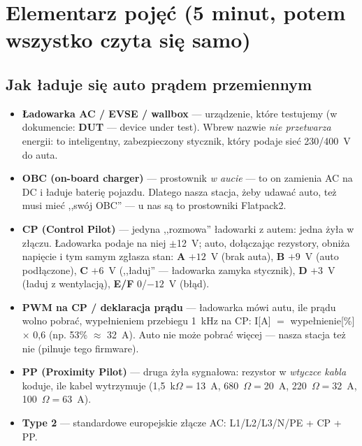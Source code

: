 \documentclass[11pt,a4paper]{article}
\newcommand{\ohm}{$\Omega$}
\newcommand{\poj}[2]{\item \textbf{#1} --- #2}
\begin{document}
\section{Elementarz pojęć (5 minut, potem wszystko czyta się samo)}
\label{sec:elementarz}

\subsection{Jak ładuje się auto prądem przemiennym}
\begin{itemize}
\poj{Ładowarka AC / EVSE / wallbox}{urządzenie, które testujemy (w dokumencie: \textbf{DUT} ---
device under test). Wbrew nazwie \emph{nie przetwarza} energii: to inteligentny, zabezpieczony
stycznik, który podaje sieć 230/400~V do auta.}
\poj{OBC (on-board charger)}{prostownik \emph{w aucie} --- to on zamienia AC na DC i ładuje baterię
pojazdu. Dlatego nasza stacja, żeby udawać auto, też musi mieć ,,swój OBC'' --- u nas są to
prostowniki Flatpack2.}
\poj{CP (Control Pilot)}{jedyna ,,rozmowa'' ładowarki z autem: jedna żyła w złączu. Ładowarka podaje
na niej $\pm$12~V; auto, dołączając rezystory, obniża napięcie i tym samym zgłasza stan:
\textbf{A} $+12$~V (brak auta), \textbf{B} $+9$~V (auto podłączone), \textbf{C} $+6$~V (,,ładuj'' ---
ładowarka zamyka stycznik), \textbf{D} $+3$~V (ładuj z wentylacją), \textbf{E/F} 0/$-12$~V (błąd).}
\poj{PWM na CP / deklaracja prądu}{ładowarka mówi autu, ile prądu wolno pobrać, wypełnieniem
przebiegu 1~kHz na CP: I[A] $=$ wypełnienie[\%] $\times$ 0,6 (np. 53\% $\approx$ 32~A). Auto nie
może pobrać więcej --- nasza stacja też nie (pilnuje tego firmware).}
\poj{PP (Proximity Pilot)}{druga żyła sygnałowa: rezystor w \emph{wtyczce kabla} koduje, ile kabel
wytrzymuje (1,5~k\ohm$=$13~A, 680~\ohm$=$20~A, 220~\ohm$=$32~A, 100~\ohm$=$63~A).}
\poj{Type 2}{standardowe europejskie złącze AC: L1/L2/L3/N/PE + CP + PP.}
\end{itemize}
\end{document}
